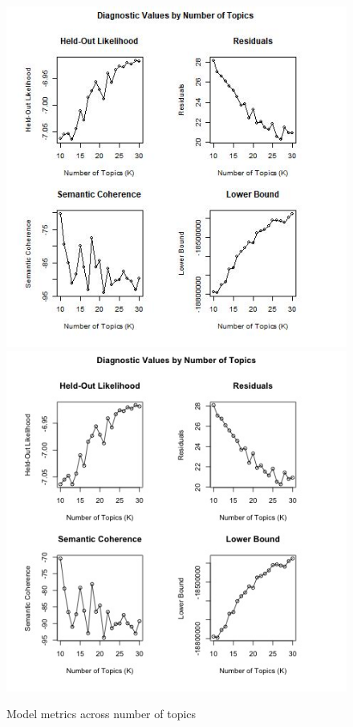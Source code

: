 \documentclass [12pt]{article}
\begin{document}
\begin{figure}
	\includegraphics[width = 125mm]{../tables_figures/search_k_poc.jpeg}
	\includegraphics[width = 125mm]{../tables_figures/search_k_male.jpeg}
	\caption{Model metrics across number of topics}
	\label{fig:search_k_performance}
\end{figure}
\end{document}
